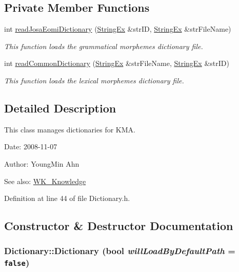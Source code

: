 \subsection*{Private Member Functions}
\begin{CompactItemize}
\item 
int \hyperlink{classkmaOrange_1_1Dictionary_4c967c6ea71838873cae66726744a3c6}{readJosaEomiDictionary} (\hyperlink{classStringEx}{StringEx} \&strID, \hyperlink{classStringEx}{StringEx} \&strFileName)
\begin{CompactList}\small\item\em This function loads the grammatical morphemes dictionary file. \item\end{CompactList}\item 
int \hyperlink{classkmaOrange_1_1Dictionary_e29df4e3436b7fa1f06c9afea1f3c633}{readCommonDictionary} (\hyperlink{classStringEx}{StringEx} \&strFileName, \hyperlink{classStringEx}{StringEx} \&strID)
\begin{CompactList}\small\item\em This function loads the lexical morphemes dictionary file. \item\end{CompactList}\end{CompactItemize}


\subsection{Detailed Description}
This class manages dictionaries for KMA. 

\begin{Desc}
\item[Date:]2008-11-07 \end{Desc}
\begin{Desc}
\item[Author:]YoungMin Ahn \end{Desc}
\begin{Desc}
\item[See also:]\hyperlink{classWK__Knowledge}{WK\_\-Knowledge} \end{Desc}


Definition at line 44 of file Dictionary.h.

\subsection{Constructor \& Destructor Documentation}
\hypertarget{classkmaOrange_1_1Dictionary_8a745b21ae847b6763db962023ee7656}{
\subsubsection[{Dictionary}]{\setlength{\rightskip}{0pt plus 5cm}Dictionary::Dictionary (bool {\em willLoadByDefaultPath} = {\tt false})}}
\label{classkmaOrange_1_1Dictionary_8a745b21ae847b6763db962023ee7656}


